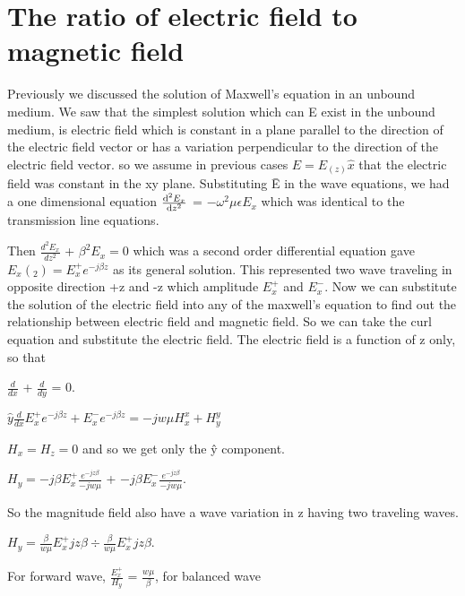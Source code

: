 \chapter{The ratio of electric field to magnetic field}
Previously we discussed the solution of  Maxwell's equation in an unbound medium. We saw that the simplest solution which can E exist in the unbound medium, is electric field which is constant in a plane parallel to the direction of the electric field vector or has a variation perpendicular to the direction of the electric field vector. so we assume in previous cases $\hat{E}=E_(z)\hat{x}$ that the electric field was constant in the xy plane. Substituting \={E} in the wave equations, we had a one dimensional equation $\dv[2]{E_x}{z}$ = $-\omega^2\mu\epsilon E_x$ which was identical to the transmission line equations. 

Then $\frac{d^2E_x}{dz^2}$ + $\beta^2 E_x = 0$ which was a second order differential equation gave $E_x(_{2}) = E_x^{+}e^{-j\beta z}$ as its general solution. This represented two wave traveling in opposite direction +z and -z which amplitude $E_x^{+}$ and $E_x^{-}$. Now we can substitute the solution of the electric field into any of the maxwell's equation to find out the relationship between electric field and magnetic field. So we can take the curl equation and substitute the electric field. The electric field is a function of z only, so that

$\frac{d}{dx}$ + $\frac{d}{dy}$ = 0.

$\hat{y} \frac{d}{dx} E_x^{+} e^{-j \beta z} + E_x^{-} e^{-j\beta z} = -jw \mu H_x^{x} + H_y^
{y}$

$H_x = H_z = 0$ and so we get only the \^{y} component.

$H_y = -j\beta E_x^{+}\frac{e^{-jz\beta}}{-jw\mu}$ + $-j \beta E_x^{-}\frac{e^{-jz\beta}}{-jw\mu}$.

So the magnitude field also have a wave variation in z having two traveling waves. 

$H_y = \frac{\beta}{w\mu}E_x^{+}jz\beta \div \frac{\beta}{w\mu}E_x^{+}jz\beta$.

For forward wave, $\frac{E_x^+}{H_y}$ = $\frac{w\mu}{\beta}$, for balanced wave 

